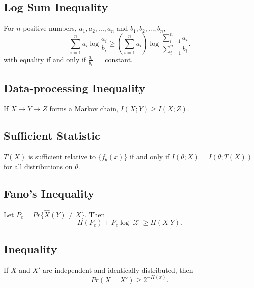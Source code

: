 \documentclass{article}
\begin{document}
\subsection*{Log Sum Inequality}
For $n$ positive numbers, $a_1,a_2,...,a_n$ and $b_1,b_2,...,b_n$, \begin{equation}
\sum_{i=1}^n a_i\log \frac{a_i}{b_i}\geq (\sum_{i=1}^na_i)\log \frac{\sum_{i=1}^na_i}{\sum_{i=1}^nb_i}.
\end{equation} with equality if and only if $\frac{a_i}{b_i}=$ constant.
\subsection*{Data-processing Inequality}
If $X\rightarrow Y\rightarrow Z$ forms a Markov chain, $I(X;Y)\geq I(X;Z)$.
\subsection*{Sufficient Statistic}
$T(X)$ is sufficient relative to $\{f_\theta(x)\}$ if and only if $I(\theta;X)=I(\theta;T(X))$ for all distributions on $\theta$.
\subsection*{Fano's Inequality}
Let $P_e=Pr\{\hat{X}(Y)\neq X\}$. Then \begin{equation}
H(P_e) +P_e\log |\mathcal{X}|\geq H(X|Y).
\end{equation}
\subsection*{Inequality}
If $X$ and $X'$ are independent and identically distributed, then \begin{equation}
Pr(X=X')\geq 2^{-H(x)}.
\end{equation}
\end{document}
